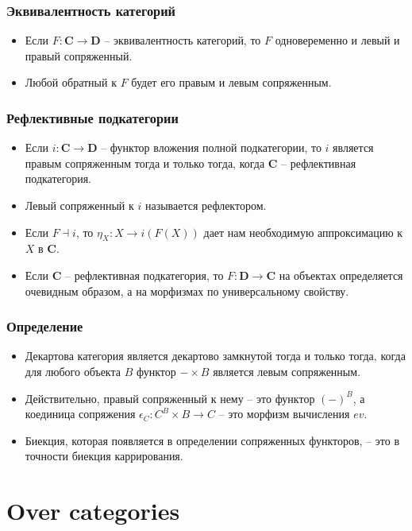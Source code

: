\documentclass{beamer}
\theoremstyle{definition}
\newcommand{\cat}[1]{\mathbf{#1}}
\renewcommand{\C}{\cat{C}}
\newcommand{\D}{\cat{D}}
\begin{document}
\begin{frame}
\frametitle{Эквивалентность категорий}
\begin{itemize}
\item Если $F : \C \to \D$ -- эквивалентность категорий, то $F$ одновеременно и левый и правый сопряженный.
\item Любой обратный к $F$ будет его правым и левым сопряженным.
\end{itemize}
\end{frame}

\begin{frame}
\frametitle{Рефлективные подкатегории}
\begin{itemize}
\item Если $i : \C \to \D$ -- функтор вложения полной подкатегории, то $i$ является правым сопряженным тогда и только тогда, когда $\C$ -- рефлективная подкатегория.
\item Левый сопряженный к $i$ называется рефлектором.
\item Если $F \dashv i$, то $\eta_X : X \to i(F(X))$ дает нам необходимую аппроксимацию к $X$ в $\C$.
\item Если $\C$ -- рефлективная подкатегория, то $F : \D \to \C$ на объектах определяется очевидным образом, а на морфизмах по универсальному свойству.
\end{itemize}
\end{frame}

\begin{frame}
\frametitle{Определение}
\begin{itemize}
\item Декартова категория является декартово замкнутой тогда и только тогда, когда для любого объекта $B$ функтор $- \times B$ является левым сопряженным.
\item Действительно, правый сопряженный к нему -- это функтор $(-)^B$, а коединица сопряжения $\epsilon_C : C^B \times B \to C$ -- это морфизм вычисления $ev$.
\item Биекция, которая появляется в определении сопряженных функторов, -- это в точности биекция каррирования.
\end{itemize}
\end{frame}

\section{Over categories}
\end{document}
